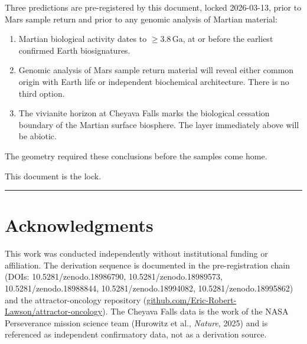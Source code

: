 \documentclass[11pt, a4paper]{article}
\begin{document}
Three predictions are pre-registered
by this document, locked 2026-03-13,
prior to Mars sample return and prior
to any genomic analysis of Martian
material:

\begin{enumerate}[leftmargin=*, label=(\arabic*)]
\item Martian biological activity dates to
  $\geq$3.8\,Ga, at or before the earliest
  confirmed Earth biosignatures.
\item Genomic analysis of Mars sample return
  material will reveal either common origin
  with Earth life or independent biochemical
  architecture.
  There is no third option.
\item The vivianite horizon at Cheyava Falls
  marks the biological cessation boundary
  of the Martian surface biosphere.
  The layer immediately above will be
  abiotic.
\end{enumerate}

The geometry required these conclusions
before the samples come home.

This document is the lock.

\vspace{1em}
\noindent\textcolor{rulecolor}{\rule{\linewidth}{0.4pt}}

\section*{Acknowledgments}

This work was conducted independently without
institutional funding or affiliation.
The derivation sequence is documented in the
pre-registration chain
(DOIs: 10.5281/zenodo.18986790,
10.5281/zenodo.18989573,
10.5281/zenodo.18988844,
10.5281/zenodo.18994082,
10.5281/zenodo.18995862)
and the attractor-oncology repository
(\href{https://github.com/Eric-Robert-Lawson/attractor-oncology}
{github.com/Eric-Robert-Lawson/attractor-oncology}).
The Cheyava Falls data is the work of the NASA
Perseverance mission science team
(Hurowitz et al., \textit{Nature}, 2025)
and is referenced as independent
confirmatory data, not as a derivation source.
\end{document}
